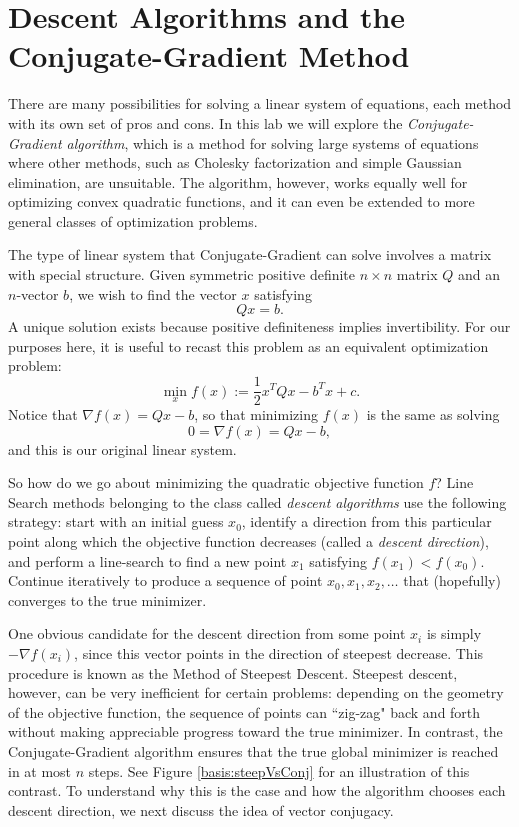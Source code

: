 
\section*{Descent Algorithms and the Conjugate-Gradient Method}
There are many possibilities for solving a linear system of equations, each method with its own set of pros and cons. In this lab we
will explore the \emph{Conjugate-Gradient algorithm}, which is a method for solving large systems of equations where other methods,
such as Cholesky factorization and simple Gaussian elimination, are unsuitable. The algorithm, however, works equally well for
optimizing convex quadratic functions, and it can even be extended to more general classes of optimization problems.

The type of linear system that Conjugate-Gradient can solve involves a matrix with special structure.
Given symmetric positive definite $n\times n$ matrix $Q$ and an $n$-vector $b$, we wish to find the vector $x$ satisfying
$$
Qx = b.
$$
A unique solution exists because positive definiteness implies invertibility.
For our purposes here, it is useful to recast this problem as an equivalent optimization problem:
$$
\min_{x} f(x) := \frac{1}{2}x^TQx - b^Tx + c.
$$
Notice that $\nabla f(x) = Qx - b$, so that minimizing $f(x)$ is the same as solving
$$
0 = \nabla f(x) = Qx - b,
$$
and this is our original linear system.

So how do we go about minimizing the quadratic objective function $f$? Line Search methods belonging to the class called
\emph{descent algorithms} use the following strategy: start with an initial guess $x_0$, identify a direction from
this particular point along which the objective function decreases (called a \emph{descent direction}), and perform a line-search to
find a new point $x_1$ satisfying $f(x_1) < f(x_0)$. Continue iteratively to produce a sequence of point $x_0, x_1, x_2, \ldots$
that (hopefully) converges to the true minimizer.

One obvious candidate for the descent direction from some point $x_i$ is simply
$-\nabla f(x_i)$, since this vector points in the direction of steepest decrease. This procedure is known as the Method of Steepest
Descent. Steepest descent, however, can be very inefficient for certain problems: depending on the geometry
of the objective function, the sequence of points can ``zig-zag" back and forth without making appreciable progress toward the true
minimizer. In contrast, the Conjugate-Gradient algorithm ensures that the true global minimizer is reached in at most $n$ steps. See
Figure \ref{basis:steepVsConj} for an illustration of this contrast.
To understand why this is the case and how the algorithm chooses each descent direction, we next discuss the idea of vector conjugacy.

